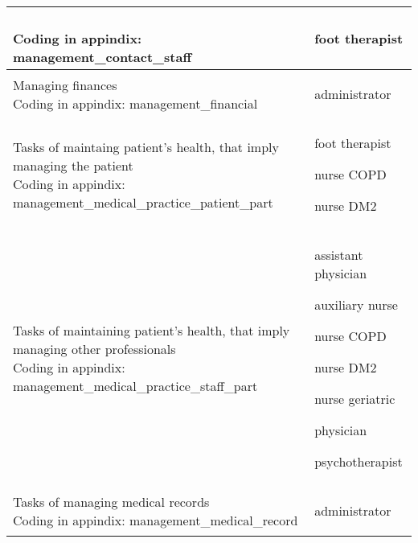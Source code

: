 \documentclass[12pt,a4paper,oneside]{article}
\begin{document}
\begin{table}
\begin{tabularx}{\textwidth}{|X|X|}
{\newline\tiny Coding in appindix: {management\_contact\_staff}}&{\begin{itemize}
\vspace{-1.5em}\setlength\itemsep{0em}
{ \item foot therapist}
\vspace{-.5em}\end{itemize}}\\
\hline
Managing finances
{\newline\tiny Coding in appindix: {management\_financial}}&{\begin{itemize}
\vspace{-1.5em}\setlength\itemsep{0em}
{ \item administrator}
\vspace{-.5em}\end{itemize}}\\
\hline
Tasks of maintaing patient's health, that imply managing the patient
{\newline\tiny Coding in appindix:\newline {management\_medical\_practice\_patient\_part}}&{\begin{itemize}
\vspace{-1.5em}\setlength\itemsep{0em}
{ \item foot therapist}
{ \item nurse COPD}
{ \item nurse DM2}
\vspace{-.5em}\end{itemize}}\\
\hline
Tasks of maintaining patient's health, that imply managing other professionals
{\newline\tiny Coding in appindix: {management\_medical\_practice\_staff\_part}}&{\begin{itemize}
\vspace{-1.5em}\setlength\itemsep{0em}
{ \item assistant physician}
{ \item auxiliary nurse }
{ \item nurse COPD}
{ \item nurse DM2}
{ \item nurse geriatric}
{ \item physician}
{ \item psychotherapist}
\vspace{-.5em}\end{itemize}}\\
\hline
Tasks of managing medical records
{\newline\tiny Coding in appindix: {management\_medical\_record}}&{\begin{itemize}
\vspace{-1.5em}\setlength\itemsep{0em}
{ \item administrator}
\vspace{-.5em}\end{itemize}}\\
\hline
\end{tabularx}
\end{table}
\end{document}
